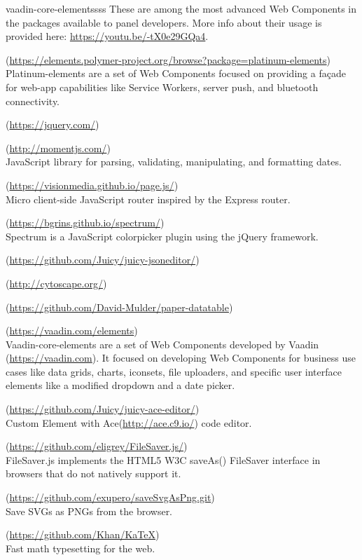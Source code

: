 \begin{labeling}{vaadin-core-elementssss}
These are among the most advanced Web Components in the packages available to
panel developers.
More info about their usage is provided here: \url{https://youtu.be/-tX0e29GQa4}.
\item [\textbf{platinum-elements}] (\url{https://elements.polymer-project.org/browse?package=platinum-elements})
Platinum-elements are a set of Web Components focused on providing a façade for
web-app capabilities like Service Workers, server push, and bluetooth connectivity.
\item [\textbf{jQuery}] (\url{https://jquery.com/})
\item [\textbf{moment.js}] (\url{http://momentjs.com/}) \\
JavaScript library for parsing, validating, manipulating, and formatting dates.
\item [\textbf{page.js}] (\url{https://visionmedia.github.io/page.js/}) \\
Micro client-side JavaScript router inspired by the Express router.
\item [\textbf{spectrum.js}] (\url{https://bgrins.github.io/spectrum/}) \\
Spectrum is a JavaScript colorpicker plugin using the jQuery framework.
\item [\textbf{juicy-jsoneditor}] (\url{https://github.com/Juicy/juicy-jsoneditor/})
\item [\textbf{cytoscape}] (\url{http://cytoscape.org/})
\item [\textbf{paper-datatable}] (\url{https://github.com/David-Mulder/paper-datatable})
\item [\textbf{vaadin-core-elements}] (\url{https://vaadin.com/elements}) \\
Vaadin-core-elements are a set of Web Components developed by Vaadin
(\url{https://vaadin.com}). It focused on developing Web Components for business
use cases like data grids, charts, iconsets, file uploaders, and specific user
interface elements like a modified dropdown and a date picker.
\item [\textbf{juicy-ace-editor}] (\url{https://github.com/Juicy/juicy-ace-editor/}) \\
Custom Element with Ace(\url{http://ace.c9.io/}) code editor.
\item [\textbf{file-saver.js}] (\url{https://github.com/eligrey/FileSaver.js/}) \\
FileSaver.js implements the HTML5 W3C saveAs() FileSaver interface in browsers that do not natively support it.
\item [\textbf{saveSvgAsPng}] (\url{https://github.com/exupero/saveSvgAsPng.git}) \\
Save SVGs as PNGs from the browser.
\item [\textbf{KaTeX}] (\url{https://github.com/Khan/KaTeX}) \\
Fast math typesetting for the web.
\end{labeling}

